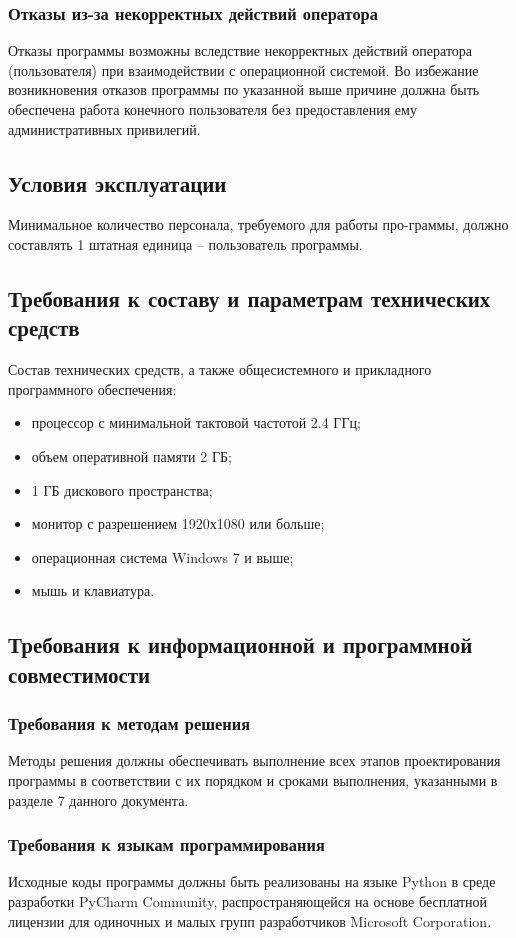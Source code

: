 \documentclass[14pt]{extarticle}        %
\begin{document}
\subsubsection {Отказы из-за некорректных действий оператора}
Отказы программы возможны вследствие некорректных действий оператора (пользователя) при взаимодействии с операционной системой. Во избежание возникновения отказов программы по указанной выше причине должна быть обеспечена работа конечного пользователя без предоставления ему административных привилегий.

\subsection {Условия эксплуатации}
Минимальное количество персонала, требуемого для работы про-граммы, должно составлять 1 штатная единица – пользователь программы.

\subsection {Требования к составу и параметрам технических средств}
Состав технических средств, а также общесистемного и прикладного программного обеспечения:
\begin{itemize}
    \item процессор с минимальной тактовой частотой 2.4 ГГц;
    \item объем оперативной памяти 2 ГБ; 
    \item 1 ГБ дискового пространства;
    \item монитор с разрешением 1920х1080 или больше;
    \item операционная система Windows 7 и выше;
    \item мышь и клавиатура.
\end{itemize}

\subsection {Требования к информационной и программной совместимости}
\subsubsection {Требования к методам решения}
Методы решения должны обеспечивать выполнение всех этапов проектирования программы в соответствии с их порядком и сроками выполнения, указанными в разделе 7 данного документа.
\subsubsection {Требования к языкам программирования}
Исходные коды программы должны быть реализованы на языке Python в среде разработки PyCharm Community, распространяющейся на основе бесплатной лицензии для одиночных и малых групп разработчиков Microsoft Corporation.
\end{document}
